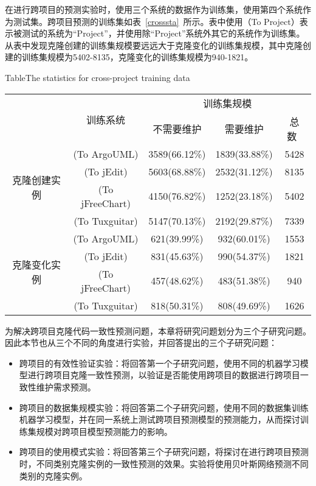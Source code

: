在进行跨项目的预测实验时，使用三个系统的数据作为训练集，使用第四个系统作为测试集。跨项目预测的训练集如表~\ref{crosssta}~所示。表中使用（To Project）表示被测试的系统为“Project”，并使用除“Project”系统外其它的系统作为训练集。从表中发现克隆创建的训练集规模要远远大于克隆变化的训练集规模，其中克隆创建的训练集规模为5402-8135，克隆变化的训练集规模为940-1821。

\begin{table}[htbp]
{Table$\!$}{The statistics for cross-project training data}
\vspace{0.5em}
\centering
\wuhao
\begin{tabular}{ccccc}
\toprule[1.5pt]
~\multirow{2}{*}{类型}&\multirow{2}{*}{训练系统}&\multicolumn{3}{c}{训练集规模}\\
\cline{3-5}
~&~&{不需要维护}&{需要维护}&{总数}~\\
\midrule[1pt]
\multirow{4}{*}{克隆创建实例}
&(To ArgoUML)&3589(66.12\%)&1839(33.88\%)&5428\\
&(To jEdit)&5603(68.88\%)&2532(31.12\%)&8135\\
&(To jFreeChart)&4150(76.82\%)&1252(23.18\%)&5402\\
&(To Tuxguitar)&	5147(70.13\%)&2192(29.87\%)&	7339\\
\hline
\multirow{4}{*}{克隆变化实例}
&(To ArgoUML)&621(39.99\%)&932(60.01\%)&1553\\
&(To jEdit)&831(45.63\%)&990(54.37\%)&1821\\
&(To jFreeChart)&457(48.62\%)&483(51.38\%)&940\\
&(To Tuxguitar)&	818(50.31\%)&808(49.69\%)&1626\\
\bottomrule[1.5pt]
\end{tabular}
\end{table}

为解决跨项目克隆代码一致性预测问题，本章将研究问题划分为三个子研究问题。因此本节也从三个不同的角度进行实验，并回答提出的三个子研究问题：
\begin{itemize}
\item
跨项目的有效性验证实验：将回答第一个子研究问题，使用不同的机器学习模型进行跨项目克隆一致性预测，以验证是否能使用跨项目的数据进行跨项目一致性维护需求预测。
\item
跨项目的数据集规模实验：将回答第二个子研究问题，使用不同的数据集训练机器学习模型，并在同一系统上测试跨项目预测模型的预测能力，从而探讨训练集规模对跨项目模型预测能力的影响。
\item
跨项目的使用模式实验：将回答第三个子研究问题，将探讨在进行跨项目预测时，不同类别克隆实例的一致性预测的效果。实验将使用贝叶斯网络预测不同类别的克隆实例。
\end{itemize}

